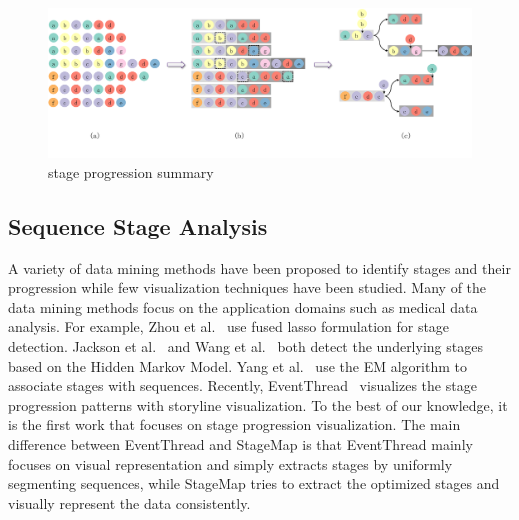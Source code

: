 \begin{figure}
	\centering
	\includegraphics[width=\linewidth]{pictures/summary}
	\caption{stage progression summary 
	}
	\label{fig:summary}
\end{figure}

\subsection{Sequence Stage Analysis}

A variety of data mining methods have been proposed to identify stages and their progression while few visualization techniques have been studied. Many of the data mining methods focus on the application domains such as medical data analysis. For example, Zhou et al.~\cite{zhou2013modeling} use fused lasso formulation for stage detection. Jackson et al.~\cite{jackson2003multistate} and Wang et al.~\cite{lu2016exploring} both detect the underlying stages based on the Hidden Markov Model. Yang et al.~\cite{yang2014finding} use the EM algorithm to associate stages with sequences. Recently, EventThread~\cite{guo2018eventthread} visualizes the stage progression patterns with storyline visualization. To the best of our knowledge, it is the first work that focuses on stage progression visualization. The main difference between EventThread and StageMap is that EventThread mainly focuses on visual representation and simply extracts stages by uniformly segmenting sequences, while StageMap tries to extract the optimized stages and visually represent the data consistently. 


